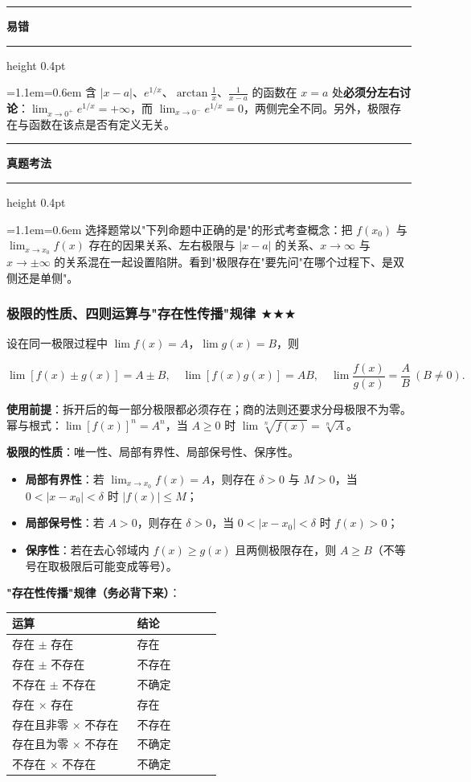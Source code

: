 \documentclass[11pt,openany,UTF8]{ctexbook}
\newcommand{\callouthead}[2]{%
  \par\addvspace{7pt}\noindent
  {\color{#1}\rule[-0.15em]{3pt}{1.05em}}\hspace{0.5em}%
  {\bfseries\color{#1}#2}\par\nobreak\vspace{-0.35em}%
  {\color{rulesep}\hrule height 0.4pt}\nobreak\vspace{0.45em}%
  \begingroup\small\setlength{\parindent}{0pt}%
  \leftskip=1.1em\rightskip=0.6em\noindent\ignorespaces}
\newcommand{\calloutend}{\par\endgroup\addvspace{7pt}}
\newenvironment{callwarn}[1]{\callouthead{warnbar}{#1}}{\calloutend}
\newenvironment{callexam}[1]{\callouthead{exambar}{#1}}{\calloutend}
\begin{document}
\begin{callwarn}{易错}
含 $\vert x-a\vert$、$e^{1/x}$、$\arctan\frac1x$、$\frac{1}{x-a}$ 的函数在 $x=a$ 处\textbf{必须分左右讨论}：$\lim_{x\to 0^+}e^{1/x}=+\infty$，而 $\lim_{x\to 0^-}e^{1/x}=0$，两侧完全不同。另外，极限存在与函数在该点是否有定义无关。

\end{callwarn}

\begin{callexam}{真题考法}
选择题常以"下列命题中正确的是"的形式考查概念：把 $f(x_0)$ 与 $\lim_{x\to x_0}f(x)$ 存在的因果关系、左右极限与 $\vert x-a\vert$ 的关系、$x\to\infty$ 与 $x\to\pm\infty$ 的关系混在一起设置陷阱。看到"极限存在"要先问"在哪个过程下、是双侧还是单侧"。

\end{callexam}

\subsubsection{极限的性质、四则运算与"存在性传播"规律 $\bigstar$$\bigstar$$\bigstar$}

设在同一极限过程中 $\lim f(x)=A$，$\lim g(x)=B$，则

\[\lim[f(x)\pm g(x)]=A\pm B,\quad \lim[f(x)g(x)]=AB,\quad \lim\frac{f(x)}{g(x)}=\frac{A}{B}\ (B\ne 0).\]

\textbf{使用前提}：拆开后的每一部分极限都必须存在；商的法则还要求分母极限不为零。幂与根式：$\lim[f(x)]^n=A^n$，当 $A\ge 0$ 时 $\lim\sqrt[n]{f(x)}=\sqrt[n]{A}$。

\textbf{极限的性质}：唯一性、局部有界性、局部保号性、保序性。

\begin{itemize}
\item \textbf{局部有界性}：若 $\lim_{x\to x_0}f(x)=A$，则存在 $\delta>0$ 与 $M>0$，当 $0<\vert x-x_0\vert<\delta$ 时 $\vert f(x)\vert\le M$；
\item \textbf{局部保号性}：若 $A>0$，则存在 $\delta>0$，当 $0<\vert x-x_0\vert<\delta$ 时 $f(x)>0$；
\item \textbf{保序性}：若在去心邻域内 $f(x)\ge g(x)$ 且两侧极限存在，则 $A\ge B$（不等号在取极限后可能变成等号）。
\end{itemize}
\textbf{"存在性传播"规律（务必背下来）}：

\begingroup\small\setlength{\tabcolsep}{4.0pt}
\begin{longtable}{@{}L{0.5629\linewidth}L{0.3828\linewidth}@{}}
\toprule
\textbf{运算} & \textbf{结论} \\
\midrule
\endhead
存在 $\pm$ 存在 & 存在 \\
存在 $\pm$ 不存在 & 不存在 \\
不存在 $\pm$ 不存在 & 不确定 \\
存在 $\times$ 存在 & 存在 \\
存在且非零 $\times$ 不存在 & 不存在 \\
存在且为零 $\times$ 不存在 & 不确定 \\
不存在 $\times$ 不存在 & 不确定 \\
\bottomrule
\end{longtable}
\endgroup
\end{document}
